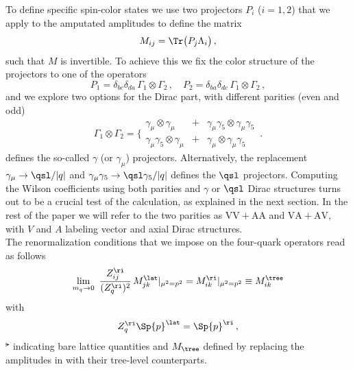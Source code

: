 \documentclass[aps,prd,twocolumn,nofootinbib,showpacs,superscriptaddress]{revtex4-1}
\begin{document}
To define specific spin-color states we use two projectors $P_i$ 
($i=1,2$) that we apply to the amputated amplitudes to define the matrix 
\begin{equation}
M_{ij} = \Tr \big( P_j \Lambda_i \big) \,,
\label{eq:M}
\end{equation}
such that $M$ is invertible.
To achieve this we fix the color structure of the projectors to one of the operators
\begin{equation}
P_1 = \delta_{bc} \delta_{da} \, \Gamma_1 \otimes \Gamma_2 \,, \quad
P_2 = \delta_{ba} \delta_{dc} \, \Gamma_1 \otimes \Gamma_2 \,,
\end{equation}
and we explore two options for the Dirac part, 
with different parities (even and odd)
\begin{equation}
\Gamma_1 \otimes \Gamma_2 = \bigg\lbrace
\begin{array}{lcl}
\gamma_\mu \otimes \gamma_\mu & + & \gamma_\mu \gamma_5 \otimes \gamma_\mu \gamma_5 \\
\gamma_\mu \gamma_5 \otimes \gamma_\mu & + & \gamma_\mu \otimes \gamma_\mu \gamma_5 
\end{array}\,.
\label{eq:gammaproj}
\end{equation}
 defines the so-called $\gamma$ (or $\gamma_\mu$) projectors. 
Alternatively, 
the replacement $\gamma_\mu \to \qsl /|q|$ and $\gamma_\mu \gamma_5 \to \qsl \gamma_5/|q|$
defines the $\qsl$ projectors.
Computing the Wilson coefficients using both 
parities and $\gamma$ or $\qsl$ Dirac structures 
turns out to be a
crucial test of the calculation, as explained in the next section.
In the rest of the paper we will refer to the two parities as
$\mathrm{VV}+\mathrm{AA}$ and $\mathrm{VA}+\mathrm{AV}$, with 
$V$ and $A$ labeling vector and axial Dirac structures.\\

The renormalization conditions that we impose on the four-quark
operators read as follows
\begin{equation}
\lim_{m_q \to 0} \ 
\frac{Z_{ij}^\ri}{(Z_q^\ri)^2} \, 
M_{jk}^\lat|_{\mu^2=p^2} = M_{ik}^\ri |_{\mu^2=p^2} \equiv M_{ik}^\tree
\label{eq:rimom}
\end{equation}
with
\begin{equation}
Z_q^\ri \Sp{p}^\lat = \Sp{p}^\ri \,,
\end{equation}
$^\lat$ indicating bare lattice quantities
and $M_\tree$ defined by replacing the amplitudes in  
with their tree-level counterparts.
\end{document}
